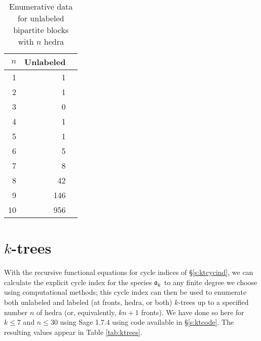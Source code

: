 \documentclass[distribution,draft]{brandiss} %
\numberwithin{section}{chapter}
\numberwithin{figure}{chapter}
\begin{document}
\begin{table}[htb]
  \centering
  \caption{Enumerative data for unlabeled bipartite blocks with $n$ hedra}
  \label{tab:bpblocks}
  \begin{tabular}{r | r r}
    $n$ & Unlabeled \\\hline
    1 & 1 \\
    2 & 1 \\
    3 & 0 \\
    4 & 1 \\
    5 & 1 \\
    6 & 5 \\
    7 & 8 \\
    8 & 42 \\
    9 & 146 \\
    10 & 956
  \end{tabular}
\end{table}

\section{$k$-trees}\label{s:ktenum}
With the recursive functional equations for cycle indices of \S \ref{s:ktcycind}, we can calculate the explicit cycle index for the species $\mathfrak{a}_{k}^{}$ to any finite degree we choose using computational methods; this cycle index can then be used to enumerate both unlabeled and labeled (at fronts, hedra, or both) $k$-trees up to a specified number $n$ of hedra (or, equivalently, $kn + 1$ fronts).
We have done so here for $k \leq 7$ and $n \leq 30$ using Sage 1.7.4 \cite{sage} using code available in \S \ref{s:ktcode}.
The resulting values appear in Table \ref{tab:ktrees}.
\end{document}
